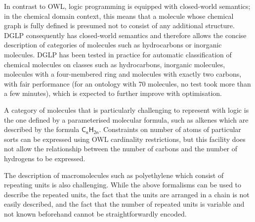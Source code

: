 \documentclass[10pt]{bmc_article}
\newenvironment{bmcformat}{\baselineskip20pt\sloppy\setboolean{publ}{false}}{\baselineskip20pt\sloppy}
\begin{document}
\begin{bmcformat}
In contrast to OWL, logic programming is equipped with closed-world semantics; in the chemical domain context, this means that a molecule whose chemical graph is fully defined is presumed not to consist of any additional structure. DGLP \cite{magka2011} consequently has closed-world semantics and therefore allows the concise description of categories of molecules such as hydrocarbons or inorganic molecules. DGLP has been tested in practice for automatic classification of chemical molecules on classes such as hydrocarbons, inorganic molecules, molecules with a four-membered ring and molecules with exactly two carbons, with fair performance (for an ontology with 70 molecules, no test took more than a few minutes), which is expected to further improve with optimisation. %

A category of molecules that is particularly challenging to represent with logic is the one defined by a parameterised molecular formula, such as alkenes which are described by the formula $\mathsf{C_nH_{2n}}$. Constraints on number of atoms of particular sorts can be expressed using OWL cardinality restrictions, but this facility does not allow the relationship between the number of carbons and the number of hydrogens to be expressed.  

The description of macromolecules such as polyethylene which consist of repeating units is also challenging. While the above formalisms can be used to describe the repeated units, the fact that the units are arranged in a chain is not easily described, and the fact that the number of repeated units is variable and not known beforehand cannot be straightforwardly encoded. %

% 




\end{bmcformat}
\end{document}
